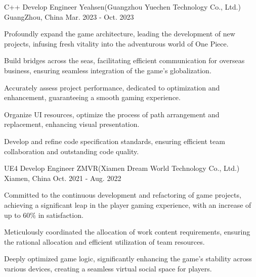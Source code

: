 

\begin{cventries}

  \cventry
    {C++ Develop Engineer} %
    {Yeahsen(Guangzhou Yuechen Technology Co., Ltd.)} %
    {GuangZhou, China} %
    {Mar. 2023 - Oct. 2023} %
    {
      \begin{cvitems} %
        \item {Profoundly expand the game architecture, leading the development of new projects, infusing fresh vitality into the adventurous world of One Piece.} 
        \item {Build bridges across the seas, facilitating efficient communication for overseas business, ensuring seamless integration of the game’s globalization.} 
        \item {Accurately assess project performance, dedicated to optimization and enhancement, guaranteeing a smooth gaming experience.} 
        \item {Organize UI resources, optimize the process of path arrangement and replacement, enhancing visual presentation.} 
        \item {Develop and refine code specification standards, ensuring efficient team collaboration and outstanding code quality.} 
      \end{cvitems}
    }

  \cventry
    {UE4 Develop Engineer} %
    {ZMVR(Xiamen Dream World Technology Co., Ltd.)} %
    {Xiamen, China} %
    {Oct. 2021 - Aug. 2022} %
    {
      \begin{cvitems} %
        \item {Committed to the continuous development and refactoring of game projects, achieving a significant leap in the player gaming experience, with an increase of up to 60\% in satisfaction.} 
        \item {Meticulously coordinated the allocation of work content requirements, ensuring the rational allocation and efficient utilization of team resources.} 
        \item {Deeply optimized game logic, significantly enhancing the game’s stability across various devices, creating a seamless virtual social space for players.} 
      \end{cvitems}
    }

\end{cventries}
